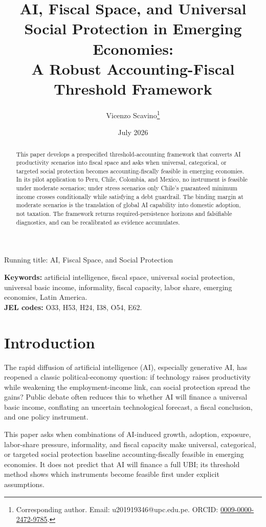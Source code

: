 \documentclass[11pt,a4paper]{article}
\title{AI, Fiscal Space, and Universal Social Protection in Emerging Economies:\\[0.2em]A Robust Accounting-Fiscal Threshold Framework}
\author{Vicenzo Scavino\thanks{Corresponding author. Email: u201919346@upc.edu.pe. ORCID: \href{https://orcid.org/0009-0000-2472-9785}{0009-0000-2472-9785}.}}
\affil{Independent Researcher, Lima, Peru}
\date{July 2026}
\begin{document}
\maketitle

\begin{center}\small Running title: AI, Fiscal Space, and Social Protection\end{center}

\begin{abstract}
This paper develops a prespecified threshold-accounting framework that converts AI productivity scenarios into fiscal space and asks when universal, categorical, or targeted social protection becomes accounting-fiscally feasible in emerging economies. In its pilot application to Peru, Chile, Colombia, and Mexico, no instrument is feasible under moderate scenarios; under stress scenarios only Chile's guaranteed minimum income crosses conditionally while satisfying a debt guardrail. The binding margin at moderate scenarios is the translation of global AI capability into domestic adoption, not taxation. The framework returns required-persistence horizons and falsifiable diagnostics, and can be recalibrated as evidence accumulates.
\end{abstract}

\noindent \textbf{Keywords:} artificial intelligence, fiscal space, universal social protection, universal basic income, informality, fiscal capacity, labor share, emerging economies, Latin America.\\
\textbf{JEL codes:} O33, H53, H24, I38, O54, E62.

\newpage

\section{Introduction}

The rapid diffusion of artificial intelligence (AI), especially generative AI, has reopened a classic political-economy question: if technology raises productivity while weakening the employment-income link, can social protection spread the gains? Public debate often reduces this to whether AI will finance a universal basic income, conflating an uncertain technological forecast, a fiscal conclusion, and one policy instrument.

This paper asks when combinations of AI-induced growth, adoption, exposure, labor-share pressure, informality, and fiscal capacity make universal, categorical, or targeted social protection baseline accounting-fiscally feasible in emerging economies. It does not predict that AI will finance a full UBI; its threshold method shows which instruments become feasible first under explicit assumptions.
\end{document}

